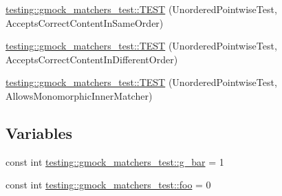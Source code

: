 \begin{DoxyCompactItemize}
\item 
\hyperlink{namespacetesting_1_1gmock__matchers__test_aa68bf48e4a8fa41fcd60f59cc60ede8f}{testing\+::gmock\+\_\+matchers\+\_\+test\+::\+T\+E\+ST} (Unordered\+Pointwise\+Test, Accepts\+Correct\+Content\+In\+Same\+Order)
\item 
\hyperlink{namespacetesting_1_1gmock__matchers__test_a3d48732b4a6069cfcf5c0dde6027dad5}{testing\+::gmock\+\_\+matchers\+\_\+test\+::\+T\+E\+ST} (Unordered\+Pointwise\+Test, Accepts\+Correct\+Content\+In\+Different\+Order)
\item 
\hyperlink{namespacetesting_1_1gmock__matchers__test_af16d28a9f3a07b8ef2962b868b4f8399}{testing\+::gmock\+\_\+matchers\+\_\+test\+::\+T\+E\+ST} (Unordered\+Pointwise\+Test, Allows\+Monomorphic\+Inner\+Matcher)
\end{DoxyCompactItemize}
\subsection*{Variables}
\begin{DoxyCompactItemize}
\item 
const int \hyperlink{namespacetesting_1_1gmock__matchers__test_a55dcc962203a3a3361d2e7e00ed99b4d}{testing\+::gmock\+\_\+matchers\+\_\+test\+::g\+\_\+bar} = 1
\item 
const int \hyperlink{namespacetesting_1_1gmock__matchers__test_a3536e68112ffbb1f76887cd15bb45c15}{testing\+::gmock\+\_\+matchers\+\_\+test\+::foo} = 0
\end{DoxyCompactItemize}
